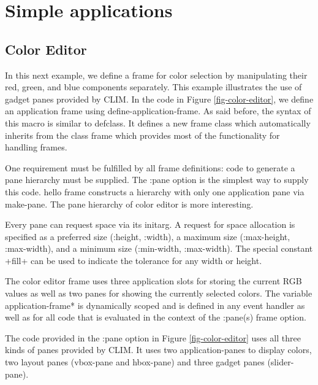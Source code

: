\documentclass[twocolumn,a4paper]{article}
\newcommand {\code}[1]{{\sffamily #1}}
\newcommand {\CLIM}{{\small CLIM}}
\let\class\code
\let\method\code
\let\constant\code
\let\variable\code
\let\keyword\code
\begin{document}
\section{Simple applications}

\subsection{Color Editor}
In this next example, we define a frame for color selection by manipulating their red, green, and blue components separately. This example illustrates the use of gadget panes provided by \CLIM{}. In the code in Figure \ref{fig-color-editor}, we define an application frame using \method{define-application-frame}. As said before, the syntax of this macro is similar to \class{defclass}. It defines a new frame class which automatically inherits from the class \class{frame} which provides most of the functionality for handling frames.

One requirement must be fulfilled by all frame definitions: code to generate a pane hierarchy must be supplied. The \keyword{:pane} option is the simplest way to supply this code. \class{hello frame} constructs a hierarchy with only one application pane via \method{make-pane}. The pane hierarchy of color editor is more interesting.

Every pane can request space via its initarg. A request for space allocation is specified as a preferred size (\keyword{:height}, \keyword{:width}), a maximum size (\keyword{:max-height}, \keyword{:max-width}), and a minimum size (\keyword{:min-width}, \keyword{:max-width}). The special constant \constant{+fill+} can be used to indicate the tolerance for any width or height.

The color editor frame uses three application slots for storing the current RGB values as well as two panes for showing the currently selected colors. The variable \variable{*application-frame*} is dynamically scoped and is defined in any event handler as well as for all code that is evaluated in the context of the \keyword{:pane(s)} frame option.

\begin{figure*}
\lstset{style=framestyle}

\caption{Color Editor}\label{fig-color-editor}
\end{figure*}

The code provided in the \keyword{:pane} option in Figure \ref{fig-color-editor} uses all three kinds of panes provided by \CLIM{}. It uses two application-panes to display colors, two layout panes (\class{vbox-pane} and \class{hbox-pane}) and three gadget panes (\class{slider-pane}).
\end{document}
